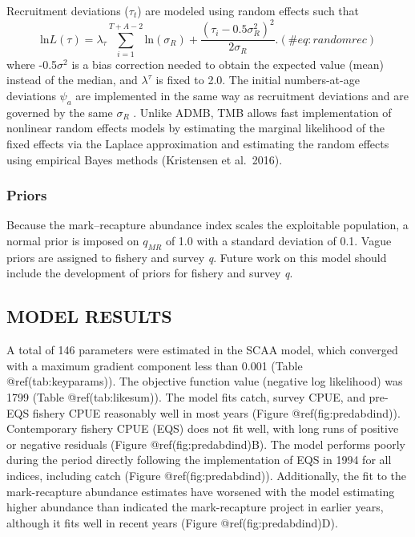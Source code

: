 \documentclass[
]{article}
\begin{document}
Recruitment deviations (\(\tau_t\)) are modeled using random effects
such that \[
\begin{equation}
\mbox{ln}L(\tau)=\lambda_{\tau}\sum_{i=1}^{T+A-2}\mbox{ln}(\sigma_R)+\frac{(\tau_i-0.5\sigma_R^2)^2}{2\sigma_R}.
(\#eq:randomrec)
\end{equation} 
\] where -0.5\(\sigma^2\) is a bias correction needed to obtain the
expected value (mean) instead of the median, and \(\lambda^{\tau}\) is
fixed to 2.0. The initial numbers-at-age deviations \(\psi_a\) are
implemented in the same way as recruitment deviations and are governed
by the same \(\sigma_R\) . Unlike ADMB, TMB allows fast implementation
of nonlinear random effects models by estimating the marginal likelihood
of the fixed effects via the Laplace approximation and estimating the
random effects using empirical Bayes methods (Kristensen et al.~2016).

\hypertarget{priors}{%
\subsubsection{Priors}\label{priors}}

Because the mark--recapture abundance index scales the exploitable
population, a normal prior is imposed on \(q_{MR}\) of 1.0 with a
standard deviation of 0.1. Vague priors are assigned to fishery and
survey \emph{q}. Future work on this model should include the
development of priors for fishery and survey \emph{q}.

\hypertarget{model-results}{%
\subsection{MODEL RESULTS}\label{model-results}}

A total of 146 parameters were estimated in the SCAA model, which
converged with a maximum gradient component less than 0.001 (Table
@ref(tab:keyparams)). The objective function value (negative log
likelihood) was 1799 (Table @ref(tab:likesum)). The model fits catch,
survey CPUE, and pre-EQS fishery CPUE reasonably well in most years
(Figure @ref(fig:predabdind)). Contemporary fishery CPUE (EQS) does not
fit well, with long runs of positive or negative residuals (Figure
@ref(fig:predabdind)B). The model performs poorly during the period
directly following the implementation of EQS in 1994 for all indices,
including catch (Figure @ref(fig:predabdind)). Additionally, the fit to
the mark-recapture abundance estimates have worsened with the model
estimating higher abundance than indicated the mark-recapture project in
earlier years, although it fits well in recent years (Figure
@ref(fig:predabdind)D).
\end{document}
